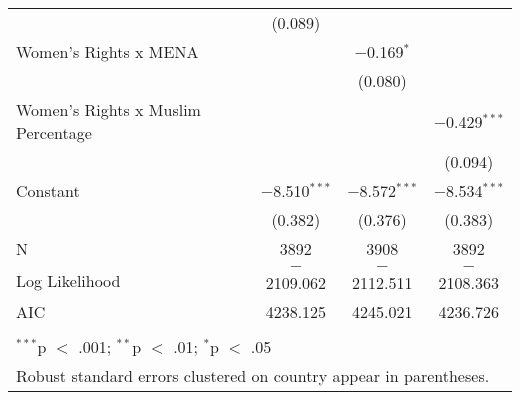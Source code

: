 \begin{table}[!htbp]
\begin{tabular}{@{\extracolsep{5pt}}lccc}
  & (0.089) &  &  \\ 
  Women's Rights x MENA &  & $-$0.169$^{*}$ &  \\ 
  &  & (0.080) &  \\ 
  Women's Rights x Muslim Percentage &  &  & $-$0.429$^{***}$ \\ 
  &  &  & (0.094) \\ 
  Constant & $-$8.510$^{***}$ & $-$8.572$^{***}$ & $-$8.534$^{***}$ \\ 
  & (0.382) & (0.376) & (0.383) \\ 
 N & 3892 & 3908 & 3892 \\ 
Log Likelihood & $-$2109.062 & $-$2112.511 & $-$2108.363 \\ 
AIC & 4238.125 & 4245.021 & 4236.726 \\ 
\hline \\[-1.8ex] 
\multicolumn{4}{l}{$^{***}$p $<$ .001; $^{**}$p $<$ .01; $^{*}$p $<$ .05} \\ 
\multicolumn{4}{l}{Robust standard errors clustered on country appear in parentheses.} \\ 
\end{tabular} 
\end{table} 
